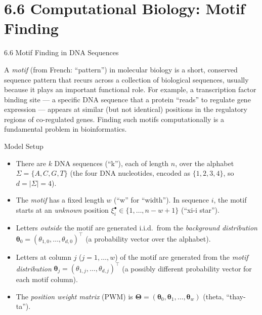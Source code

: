 \documentclass[aspectratio=169,10pt]{beamer}
\begin{document}
\section{6.6 Computational Biology: Motif Finding}

\begin{frame}[allowframebreaks]{6.6 Motif Finding in DNA Sequences}

A \emph{motif} (from French: ``pattern'') in molecular biology is a short, conserved sequence pattern that recurs across a collection of biological sequences, usually because it plays an important functional role.
For example, a transcription factor binding site --- a specific DNA sequence that a protein ``reads'' to regulate gene expression --- appears at similar (but not identical) positions in the regulatory regions of co-regulated genes.
Finding such motifs computationally is a fundamental problem in bioinformatics.

\begin{block}{Model Setup}
\begin{itemize}
  \item There are $k$ DNA sequences (``k''), each of length $n$, over the alphabet $\Sigma = \{A, C, G, T\}$ (the four DNA nucleotides, encoded as $\{1,2,3,4\}$, so $d = |\Sigma| = 4$).
  \item The \emph{motif} has a fixed length $w$ (``w'' for ``width''). In sequence $i$, the motif starts at an \emph{unknown} position $\xi_i^\bullet \in \{1, \ldots, n-w+1\}$ (``xi-i star'').
  \item Letters \emph{outside} the motif are generated i.i.d.\ from the \emph{background distribution} $\boldsymbol\theta_0 = (\theta_{1,0}, \ldots, \theta_{d,0})^\top$ (a probability vector over the alphabet).
  \item Letters at column $j$ ($j = 1, \ldots, w$) of the motif are generated from the \emph{motif distribution} $\boldsymbol\theta_j = (\theta_{1,j}, \ldots, \theta_{d,j})^\top$ (a possibly different probability vector for each motif column).
  \item The \emph{position weight matrix} (PWM) is $\boldsymbol\Theta = (\boldsymbol\theta_0, \boldsymbol\theta_1, \ldots, \boldsymbol\theta_w)$ (theta, ``thay-ta'').
\end{itemize}
\end{block}

\framebreak


\end{frame}
\end{document}
